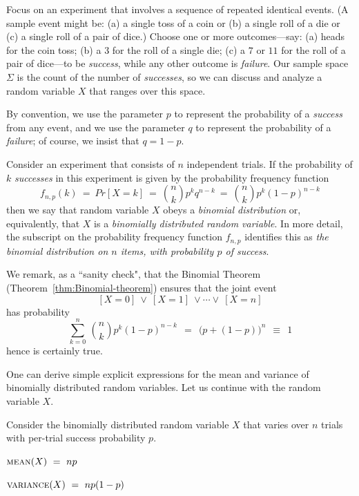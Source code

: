 Focus on an experiment that involves a sequence of repeated identical events.  (A sample event might be: (a) a single toss of a coin or (b) a single roll of a die or (c) a single roll of a pair of dice.)  Choose one or more outcomes---say: (a) {\sc heads} for the coin toss; (b) a $3$ for the roll of a single die; (c) a $7$ or $11$ for the roll of a pair of dice---to be {\em success}, while any other outcome is {\em failure}.  Our sample space $\Sigma$ is the count of the number of {\em successes}, so we can discuss and analyze a random variable $X$ that ranges over this space.

\smallskip

By convention, we use the parameter $p$ to represent the probability of a {\em success} from any event, and we use the parameter $q$ to represent the probability of a {\em failure}; of course, we insist that $q = 1-p$.

\smallskip

  
Consider an experiment that consists of $n$ independent trials.  If the probability of $k$ {\em successes} in this experiment is given by the probability frequency function
\begin{equation}
\label{eq:binomial-prob-freq}
f_{n,p}(k) \ = \ Pr[X=k] \ = \ {n \choose k} p^k q^{n-k} \ = \ {n \choose k} p^k (1-p)^{n-k}
\end{equation}
then we say that random variable $X$ obeys a {\em binomial distribution} or, equivalently, that $X$ is a {\em binomially distributed random variable}.  In more detail, the subscript on the probability frequency function $f_{n,p}$ identifies this as {\em the binomial distribution on $n$ items, with probability $p$ of success}.

\smallskip

We remark, as a ``sanity check", that the Binomial Theorem 
(Theorem~\ref{thm:Binomial-theorem}) ensures that the joint event
\[ [X=0] \ \vee \ [X=1] \ \vee \cdots  \vee \ [X=n] \]
has probability
\[ \sum_{k=0}^n \ {n \choose k} p^k (1-p)^{n-k} \ \ = \ \  \big(p + (1-p) \big)^n \ \ \equiv \ \ 1 \] 
hence is certainly {\sc true}.

\bigskip

One can derive simple explicit expressions for the mean and variance of binomially distributed random variables.  Let us continue with the random variable $X$.

\begin{prop}
\label{thm:bin-vble-mean+variance}
Consider the binomially distributed random variable $X$ that varies over $n$ trials with per-trial success probability $p$.

\smallskip

 $\mbox{\sc mean}(X) \ = \ np$

\smallskip

 $\mbox{\sc variance}(X) \ = \ np(1-p)$
\end{prop}

